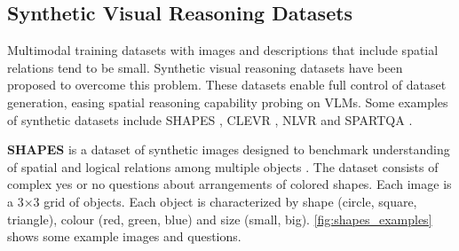 \subsection{Synthetic Visual Reasoning Datasets} \label{sec:synthetic_visual_reasoning_datasets}

Multimodal training datasets with images and descriptions that include spatial relations tend to be small. Synthetic visual reasoning datasets have been proposed to overcome this problem. These datasets enable full control of dataset generation, easing spatial reasoning capability probing  on VLMs. Some examples of synthetic datasets include SHAPES \cite{andreas2016neural}, CLEVR \cite{johnson2017clevr}, NLVR \cite{suhr-etal-2017-corpus} and SPARTQA \cite{mirzaee-etal-2021-spartqa}.

\textbf{SHAPES} is a dataset of synthetic images designed to benchmark understanding of spatial and logical relations among multiple objects \cite{andreas2016neural}. The dataset consists of complex yes or no questions about arrangements of colored shapes. Each image is a 3×3 grid of objects. Each object is characterized by shape (circle, square, triangle), colour (red, green, blue) and size (small, big). \cref{fig:shapes_examples} shows some example images and questions.

